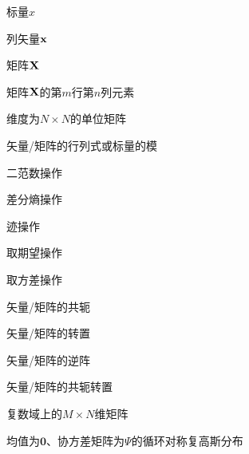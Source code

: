 \begin{denotation}

\item [${x}$] 标量${x}$
\item [${\bf{x}}$] 列矢量${\bf{x}}$
\item [${\bf{X}}$] 矩阵${\bf{X}}$
\item [${\bf{X}}_{m,n}$] 矩阵${\bf{X}}$的第$m$行第$n$列元素
\item [${\bf{I}}_N$] 维度为$N \times N$的单位矩阵
\item [$|\cdot|$] 矢量/矩阵的行列式或标量的模
\item [$\|\cdot\|$] 二范数操作
\item [$H(\cdot)$] 差分熵操作
\item [$\mathrm{tr}(\cdot)$] 迹操作
\item [$\mathbb{E}\{\cdot\}$] 取期望操作
\item [$\mathrm{Var}\{\cdot\}$] 取方差操作
\item [$(\cdot)^*$] 矢量/矩阵的共轭
\item [$(\cdot)^T$] 矢量/矩阵的转置
\item [$(\cdot)^{-1}$] 矢量/矩阵的逆阵
\item [$(\cdot)^H$] 矢量/矩阵的共轭转置
\item [$\mathbb{C}^{M \times N}$] 复数域上的$M \times N$维矩阵
\item [$\mathcal{CN}(\mathbf{0}, \Psi)$] 均值为$\mathbf{0}$、协方差矩阵为$\Psi$的循环对称复高斯分布

\end{denotation}
